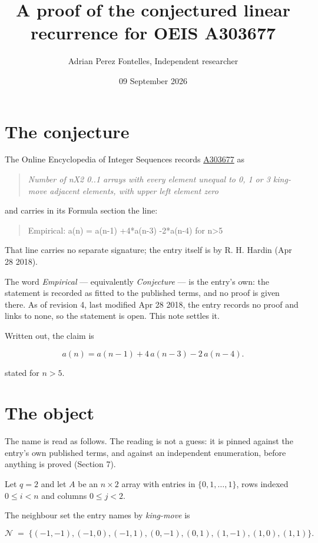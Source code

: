 \documentclass[11pt]{article}
\title{A proof of the conjectured linear recurrence for OEIS A303677}
\author{Adrian Perez Fontelles, Independent researcher}
\date{09 September 2026}
\theoremstyle{definition}
\begin{document}
\maketitle
\section{The conjecture}

The Online Encyclopedia of Integer Sequences records \href{https://oeis.org/A303677}{A303677} as

\begin{quote}\itshape Number of nX2 0..1 arrays with every element unequal to 0, 1 or 3 king-move adjacent elements, with upper left element zero\end{quote}

and carries in its Formula section the line:

\begin{quote}\ttfamily Empirical: a(n) = a(n-1) +4*a(n-3) -2*a(n-4) for n>5\end{quote}

That line carries no separate signature; the entry itself is by R. H. Hardin (Apr 28 2018).

The word {\itshape Empirical} --- equivalently {\itshape Conjecture} --- is the entry's own: the statement is recorded as fitted to the published terms, and no proof is given there. As of revision 4, last modified Apr 28 2018, the entry records no proof and links to none, so the statement is open. This note settles it.

Written out, the claim is

\[a(n) = a(n-1) + 4\,a(n-3) - 2\,a(n-4).\]

stated for $n > 5$.

\section{The object}

The name is read as follows. The reading is not a guess: it is pinned against the entry's own published terms, and against an independent enumeration, before anything is proved (Section 7).

Let $q = 2$ and let $A$ be an $n \times 2$ array with entries in $\{0,1,\dots,1\}$, rows indexed $0 \le i < n$ and columns $0 \le j < 2$.

The neighbour set the entry names by {\itshape king-move} is

\[\mathcal{N} \;=\; \{(-1,-1), (-1,0), (-1,1), (0,-1), (0,1), (1,-1), (1,0), (1,1)\}.\]
\end{document}
